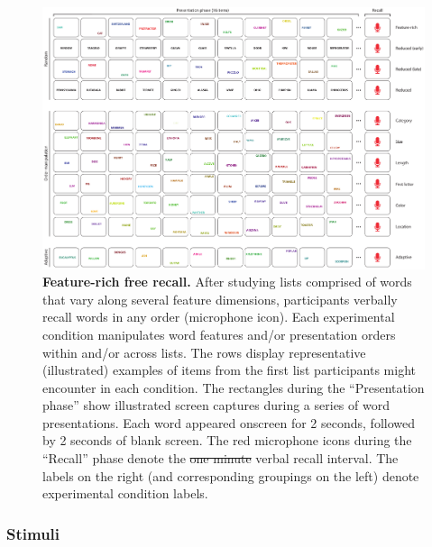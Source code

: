 \documentclass[11pt]{article}
\providecommand{\DIFaddtex}[1]{{\protect\color{blue}\uwave{#1}}} %
\providecommand{\DIFdeltex}[1]{{\protect\color{red}\sout{#1}}}                      %
\providecommand{\DIFaddFL}[1]{\DIFadd{#1}} %
\providecommand{\DIFdelFL}[1]{\DIFdel{#1}} %
\providecommand{\DIFaddbeginFL}{} %
\providecommand{\DIFaddendFL}{} %
\providecommand{\DIFdelbeginFL}{} %
\providecommand{\DIFdelendFL}{} %
\providecommand{\DIFadd}[1]{\texorpdfstring{\DIFaddtex{#1}}{#1}} %
\providecommand{\DIFdel}[1]{\texorpdfstring{\DIFdeltex{#1}}{}} %
\newcommand{\DIFscaledelfig}{0.5}
\newlength{\DIFdelgraphicswidth} %
\newlength{\DIFdelgraphicsheight} %
\newcommand{\DIFaddincludegraphics}[2][]{{\color{blue}\fbox{\DIFOincludegraphics[#1]{#2}}}} %
\newcommand{\DIFdelincludegraphics}[2][]{%
\sbox{\DIFdelgraphicsbox}{\DIFOincludegraphics[#1]{#2}}%
\settoboxwidth{\DIFdelgraphicswidth}{\DIFdelgraphicsbox} %
\settoboxtotalheight{\DIFdelgraphicsheight}{\DIFdelgraphicsbox} %
\scalebox{\DIFscaledelfig}{%
\parbox[b]{\DIFdelgraphicswidth}{\usebox{\DIFdelgraphicsbox}\\[-\baselineskip] \rule{\DIFdelgraphicswidth}{0em}}\llap{\resizebox{\DIFdelgraphicswidth}{\DIFdelgraphicsheight}{%
\setlength{\unitlength}{\DIFdelgraphicswidth}%
\begin{picture}(1,1)%
\thicklines\linethickness{2pt} %
{\color[rgb]{1,0,0}\put(0,0){\framebox(1,1){}}}%
{\color[rgb]{1,0,0}\put(0,0){\line( 1,1){1}}}%
{\color[rgb]{1,0,0}\put(0,1){\line(1,-1){1}}}%
\end{picture}%
}\hspace*{3pt}}} %
} %
\DeclareRobustCommand{\DIFaddbeginFL}{\DIFOaddbeginFL \let\includegraphics\DIFaddincludegraphics} %
\DeclareRobustCommand{\DIFaddendFL}{\DIFOaddendFL \let\includegraphics\DIFOincludegraphics} %
\DeclareRobustCommand{\DIFdelbeginFL}{\DIFOdelbeginFL \let\includegraphics\DIFdelincludegraphics} %
\DeclareRobustCommand{\DIFdelendFL}{\DIFOaddendFL \let\includegraphics\DIFOincludegraphics} %
\begin{document}
\begin{figure}[tp]
    \centering
        \includegraphics[width=\textwidth]{figures/FRFR}

\caption{\textbf{Feature-rich free recall.} After studying lists comprised of
words that vary along several feature dimensions, participants verbally recall
words in any order (microphone icon). Each experimental condition manipulates
word features and/or presentation orders within and/or across lists. The rows
display representative (illustrated) examples of items from the first list
participants might encounter in each condition. The rectangles during the
``Presentation phase'' show illustrated screen captures during a series of word
presentations. Each word appeared onscreen for 2 seconds, followed by 2 seconds
of blank screen. The red microphone icons during the ``Recall'' phase denote
the \DIFdelbeginFL \DIFdelFL{one minute }\DIFdelendFL \DIFaddbeginFL \DIFaddFL{one-minute }\DIFaddendFL verbal recall interval. The labels on the right (and
corresponding groupings on the left) denote experimental condition labels.}

    \label{fig:exp}
\end{figure}



\subsubsection*{Stimuli}
\end{document}
